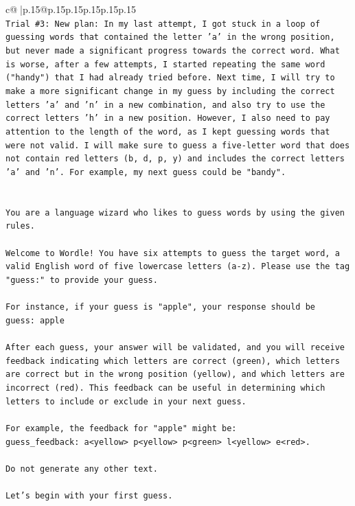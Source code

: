 \documentclass{article}
\begin{document}
{\begin{supertabular}{c@{$\;$}|p{.15\linewidth}@{}p{.15\linewidth}p{.15\linewidth}p{.15\linewidth}p{.15\linewidth}p{.15\linewidth}}
{{{\\ 
\texttt{Trial \#3: New plan: In my last attempt, I got stuck in a loop of guessing words that contained the letter 'a' in the wrong position, but never made a significant progress towards the correct word. What is worse, after a few attempts, I started repeating the same word ("handy") that I had already tried before. Next time, I will try to make a more significant change in my guess by including the correct letters 'a' and 'n' in a new combination, and also try to use the correct letters 'h' in a new position. However, I also need to pay attention to the length of the word, as I kept guessing words that were not valid. I will make sure to guess a five{-}letter word that does not contain red letters (b, d, p, y) and includes the correct letters 'a' and 'n'. For example, my next guess could be "bandy".} \\
\\ 
\\ 
\texttt{You are a language wizard who likes to guess words by using the given rules.} \\
\\ 
\texttt{Welcome to Wordle! You have six attempts to guess the target word, a valid English word of five lowercase letters (a{-}z). Please use the tag "guess:" to provide your guess.} \\
\\ 
\texttt{For instance, if your guess is "apple", your response should be} \\
\texttt{guess: apple} \\
\\ 
\texttt{After each guess, your answer will be validated, and you will receive feedback indicating which letters are correct (green), which letters are correct but in the wrong position (yellow), and which letters are incorrect (red). This feedback can be useful in determining which letters to include or exclude in your next guess.} \\
\\ 
\texttt{For example, the feedback for "apple" might be:} \\
\texttt{guess\_feedback: a<yellow> p<yellow> p<green> l<yellow> e<red>.} \\
\\ 
\texttt{Do not generate any other text.} \\
\\ 
\texttt{Let's begin with your first guess.} \\
            }
        }
    }
     \\ \\


\end{supertabular}}
\end{document}
